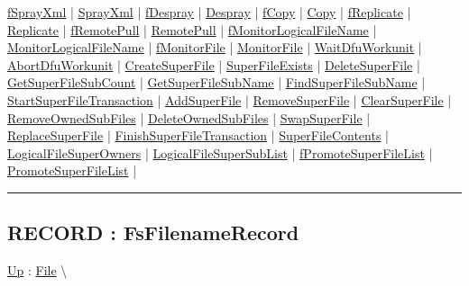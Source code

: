 \hyperlink{ecldoc:file.fsprayxml}{fSprayXml}  |
\hyperlink{ecldoc:file.sprayxml}{SprayXml}  |
\hyperlink{ecldoc:file.fdespray}{fDespray}  |
\hyperlink{ecldoc:file.despray}{Despray}  |
\hyperlink{ecldoc:file.fcopy}{fCopy}  |
\hyperlink{ecldoc:file.copy}{Copy}  |
\hyperlink{ecldoc:file.freplicate}{fReplicate}  |
\hyperlink{ecldoc:file.replicate}{Replicate}  |
\hyperlink{ecldoc:file.fremotepull}{fRemotePull}  |
\hyperlink{ecldoc:file.remotepull}{RemotePull}  |
\hyperlink{ecldoc:file.fmonitorlogicalfilename}{fMonitorLogicalFileName}  |
\hyperlink{ecldoc:file.monitorlogicalfilename}{MonitorLogicalFileName}  |
\hyperlink{ecldoc:file.fmonitorfile}{fMonitorFile}  |
\hyperlink{ecldoc:file.monitorfile}{MonitorFile}  |
\hyperlink{ecldoc:file.waitdfuworkunit}{WaitDfuWorkunit}  |
\hyperlink{ecldoc:file.abortdfuworkunit}{AbortDfuWorkunit}  |
\hyperlink{ecldoc:file.createsuperfile}{CreateSuperFile}  |
\hyperlink{ecldoc:file.superfileexists}{SuperFileExists}  |
\hyperlink{ecldoc:file.deletesuperfile}{DeleteSuperFile}  |
\hyperlink{ecldoc:file.getsuperfilesubcount}{GetSuperFileSubCount}  |
\hyperlink{ecldoc:file.getsuperfilesubname}{GetSuperFileSubName}  |
\hyperlink{ecldoc:file.findsuperfilesubname}{FindSuperFileSubName}  |
\hyperlink{ecldoc:file.startsuperfiletransaction}{StartSuperFileTransaction}  |
\hyperlink{ecldoc:file.addsuperfile}{AddSuperFile}  |
\hyperlink{ecldoc:file.removesuperfile}{RemoveSuperFile}  |
\hyperlink{ecldoc:file.clearsuperfile}{ClearSuperFile}  |
\hyperlink{ecldoc:file.removeownedsubfiles}{RemoveOwnedSubFiles}  |
\hyperlink{ecldoc:file.deleteownedsubfiles}{DeleteOwnedSubFiles}  |
\hyperlink{ecldoc:file.swapsuperfile}{SwapSuperFile}  |
\hyperlink{ecldoc:file.replacesuperfile}{ReplaceSuperFile}  |
\hyperlink{ecldoc:file.finishsuperfiletransaction}{FinishSuperFileTransaction}  |
\hyperlink{ecldoc:file.superfilecontents}{SuperFileContents}  |
\hyperlink{ecldoc:file.logicalfilesuperowners}{LogicalFileSuperOwners}  |
\hyperlink{ecldoc:file.logicalfilesupersublist}{LogicalFileSuperSubList}  |
\hyperlink{ecldoc:file.fpromotesuperfilelist}{fPromoteSuperFileList}  |
\hyperlink{ecldoc:file.promotesuperfilelist}{PromoteSuperFileList}  |

\rule{\linewidth}{0.5pt}

\subsection*{RECORD : FsFilenameRecord}
\hypertarget{ecldoc:file.fsfilenamerecord}{}
\hyperlink{ecldoc:File}{Up} :
\hspace{0pt} \hyperlink{ecldoc:File}{File} \textbackslash 

